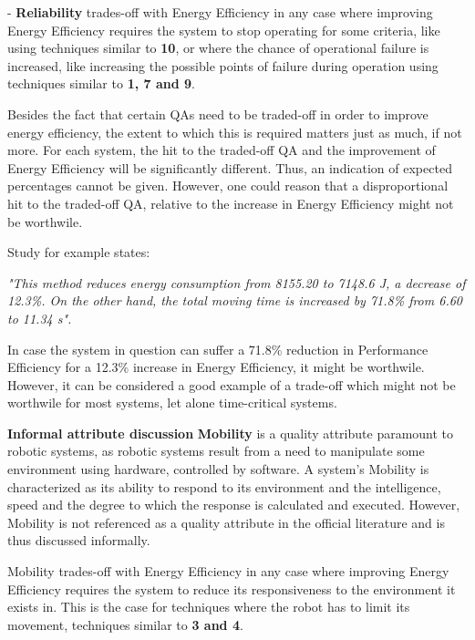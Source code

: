 - \textbf{Reliability} trades-off with Energy Efficiency in any case where improving Energy Efficiency requires the system to 
stop operating for some criteria, like using techniques similar to \textbf{10}, or where the chance of operational failure is increased, 
like increasing the possible points of failure during operation using techniques similar to \textbf{1, 7 and 9}. 

Besides the fact that certain QAs need to be traded-off in order to improve energy efficiency, the extent to which this is required 
matters just as much, if not more.
For each system, the hit to the traded-off QA and the improvement of Energy Efficiency will be significantly different.
Thus, an indication of expected percentages cannot be given.
However, one could reason that a disproportional hit to the traded-off QA, relative to the increase in Energy Efficiency might not be worthwile.

\vspace{2mm}

Study \cite{kaitwanidvilai2020industrial_robot_cycle_time} for example states: 

\noindent\textit{"This method reduces energy consumption from 8155.20 to 7148.6 J, 
a decrease of 12.3\%. On the other hand, the total moving time is increased by 71.8\% from 6.60 to 11.34 s".}

\vspace{2mm}

In case the system in question can suffer a 71.8\% reduction in Performance Efficiency for a 12.3\% increase in Energy Efficiency, it might be worthwile.
However, it can be considered a good example of a trade-off which might not be worthwile for most systems, let alone time-critical systems.

\noindent \textbf{Informal attribute discussion}
\newline
\textbf{Mobility} is a quality attribute paramount to robotic systems, 
as robotic systems result from a need to manipulate some environment using hardware, controlled by software.
A system's Mobility is characterized as its ability to respond to its environment and 
the intelligence, speed and the degree to which the response is calculated and executed.
However, Mobility is not referenced as a quality attribute in the official literature and is thus discussed informally.

Mobility trades-off with Energy Efficiency in any case where improving Energy Efficiency requires the system to reduce its responsiveness to 
the environment it exists in. This is the case for techniques where the robot has to limit its movement, techniques similar to \textbf{3 and 4}.

